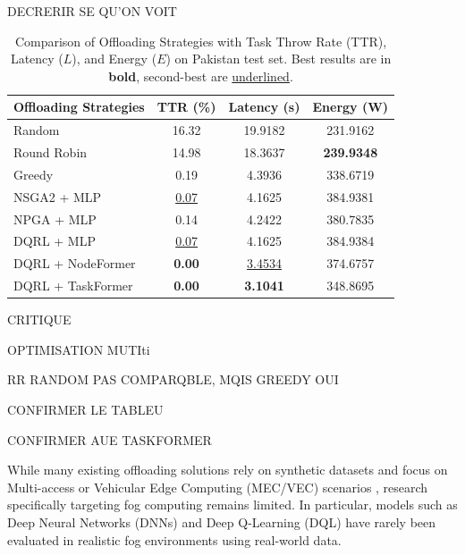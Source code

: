 DECRERIR SE QU'ON VOIT 

\begin{table}[htbp]
\centering
\caption{Comparison of Offloading Strategies with Task Throw Rate (TTR), Latency (\(L\)), and Energy (\(E\)) on Pakistan test set.
Best results are in \textbf{bold}, second-best are \underline{underlined}.}
\label{tab:results_comparison}
\begin{tabular}{lccc}
\toprule
\textbf{Offloading Strategies} & \textbf{TTR (\%)} & \textbf{Latency (s)} & \textbf{Energy (W)} \\
\midrule

Random 
 & 16.32 
 & 19.9182 
 & 231.9162 \\
 
Round Robin 
 & 14.98 
 & 18.3637 
 & \textbf{239.9348} \\
 
Greedy 
 & 0.19 
 & 4.3936 
 & 338.6719 \\
 
NSGA2 + MLP 
 & \underline{0.07} 
 & 4.1625 
 & 384.9381 \\  %
 
NPGA + MLP 
 & 0.14 
 & 4.2422 
 & 380.7835 \\
 
DQRL + MLP 
 & \underline{0.07} 
 & 4.1625 
 & 384.9384 \\  %
 
DQRL + NodeFormer 
 & \textbf{0.00} 
 & \underline{3.4534} 
 & 374.6757 \\ %
 
DQRL + TaskFormer 
 & \textbf{0.00} 
 & \textbf{3.1041} 
 & 348.8695 \\ %
 
\bottomrule
\end{tabular}
\end{table}

CRITIQUE 

OPTIMISATION MUTIti


RR RANDOM PAS COMPARQBLE, MQIS GREEDY OUI

CONFIRMER LE TABLEU

CONFIRMER AUE TASKFORMER 



While many existing offloading solutions rely on synthetic datasets and focus on Multi-access or Vehicular Edge Computing (MEC/VEC) scenarios \cite{fahimullah_review_2022, tu_task_2022, gholipour_tpto_2023}, research specifically targeting fog computing remains limited. In particular, models such as Deep Neural Networks (DNNs) \cite{sarkar_deep_2022} and Deep Q-Learning (DQL) \cite{jiang_reinforcement_2021} have rarely been evaluated in realistic fog environments using real-world data. 

